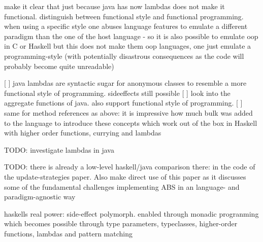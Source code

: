 make it clear that just because java has now lambdas does not make it functional. 
distinguish between functional style and functional programming. when using a specific style one abuses language features to emulate a different paradigm than the one of the host language - so it is also possible to emulate oop in C or Haskell but this does not make them oop languages, one just emulate a programming-style (with potentially disastrous consequences as the code will probably become quite unreadable)

[ ] java lambdas are syntactic sugar for anonymous classes to resemble a more functional style of programming. sideeffects still possible
[ ] look into the aggregate functions of java. also support functional style of programming.
[ ] same for method references as above: it is impressive how much bulk was added to the language to introduce these concepts which work out of the box in Haskell with higher order functions, currying and lambdas 

TODO: investigate lambdas in java

TODO: there is already a low-level haskell/java comparison there: in the code of the update-strategies paper. Also make direct use of this paper as it discusses some of the fundamental challenges implementing ABS in an language- and paradigm-agnostic way

haskells real power: side-effect polymorph. enabled through monadic progranming which becomes possible through type parameters, typeclasses, higher-order functions, lambdas and pattern matching

